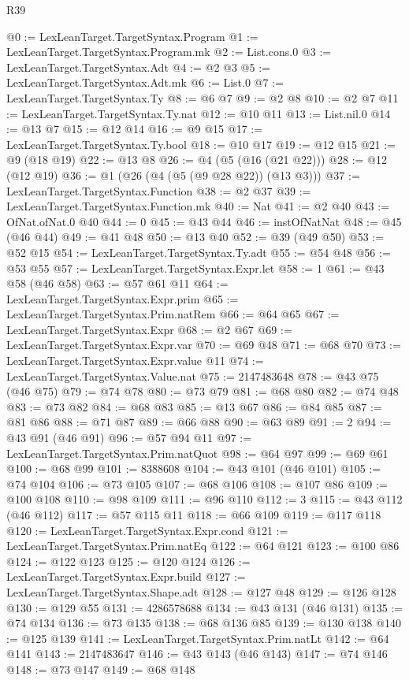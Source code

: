 \begin{lexlean}{R39}
\begin{coremodule}
@0 := LexLeanTarget.TargetSyntax.Program
@1 := LexLeanTarget.TargetSyntax.Program.mk
@2 := List.cons.{0}
@3 := LexLeanTarget.TargetSyntax.Adt
@4 := @2 @3
@5 := LexLeanTarget.TargetSyntax.Adt.mk
@6 := List.{0}
@7 := LexLeanTarget.TargetSyntax.Ty
@8 := @6 @7
@9 := @2 @8
@10 := @2 @7
@11 := LexLeanTarget.TargetSyntax.Ty.nat
@12 := @10 @11
@13 := List.nil.{0}
@14 := @13 @7
@15 := @12 @14
@16 := @9 @15
@17 := LexLeanTarget.TargetSyntax.Ty.bool
@18 := @10 @17
@19 := @12 @15
@21 := @9 (@18 @19)
@22 := @13 @8
@26 := @4 (@5 (@16 (@21 @22)))
@28 := @12 (@12 @19)
@36 := @1 (@26 (@4 (@5 (@9 @28 @22)) (@13 @3)))
@37 := LexLeanTarget.TargetSyntax.Function
@38 := @2 @37
@39 := LexLeanTarget.TargetSyntax.Function.mk
@40 := Nat
@41 := @2 @40
@43 := OfNat.ofNat.{0} @40
@44 := 0
@45 := @43 @44
@46 := instOfNatNat
@48 := @45 (@46 @44)
@49 := @41 @48
@50 := @13 @40
@52 := @39 (@49 @50)
@53 := @52 @15
@54 := LexLeanTarget.TargetSyntax.Ty.adt
@55 := @54 @48
@56 := @53 @55
@57 := LexLeanTarget.TargetSyntax.Expr.let
@58 := 1
@61 := @43 @58 (@46 @58)
@63 := @57 @61 @11
@64 := LexLeanTarget.TargetSyntax.Expr.prim
@65 := LexLeanTarget.TargetSyntax.Prim.natRem
@66 := @64 @65
@67 := LexLeanTarget.TargetSyntax.Expr
@68 := @2 @67
@69 := LexLeanTarget.TargetSyntax.Expr.var
@70 := @69 @48
@71 := @68 @70
@73 := LexLeanTarget.TargetSyntax.Expr.value @11
@74 := LexLeanTarget.TargetSyntax.Value.nat
@75 := 2147483648
@78 := @43 @75 (@46 @75)
@79 := @74 @78
@80 := @73 @79
@81 := @68 @80
@82 := @74 @48
@83 := @73 @82
@84 := @68 @83
@85 := @13 @67
@86 := @84 @85
@87 := @81 @86
@88 := @71 @87
@89 := @66 @88
@90 := @63 @89
@91 := 2
@94 := @43 @91 (@46 @91)
@96 := @57 @94 @11
@97 := LexLeanTarget.TargetSyntax.Prim.natQuot
@98 := @64 @97
@99 := @69 @61
@100 := @68 @99
@101 := 8388608
@104 := @43 @101 (@46 @101)
@105 := @74 @104
@106 := @73 @105
@107 := @68 @106
@108 := @107 @86
@109 := @100 @108
@110 := @98 @109
@111 := @96 @110
@112 := 3
@115 := @43 @112 (@46 @112)
@117 := @57 @115 @11
@118 := @66 @109
@119 := @117 @118
@120 := LexLeanTarget.TargetSyntax.Expr.cond
@121 := LexLeanTarget.TargetSyntax.Prim.natEq
@122 := @64 @121
@123 := @100 @86
@124 := @122 @123
@125 := @120 @124
@126 := LexLeanTarget.TargetSyntax.Expr.build
@127 := LexLeanTarget.TargetSyntax.Shape.adt
@128 := @127 @48
@129 := @126 @128
@130 := @129 @55
@131 := 4286578688
@134 := @43 @131 (@46 @131)
@135 := @74 @134
@136 := @73 @135
@138 := @68 @136 @85
@139 := @130 @138
@140 := @125 @139
@141 := LexLeanTarget.TargetSyntax.Prim.natLt
@142 := @64 @141
@143 := 2147483647
@146 := @43 @143 (@46 @143)
@147 := @74 @146
@148 := @73 @147
@149 := @68 @148

\end{coremodule}
\end{lexlean}
